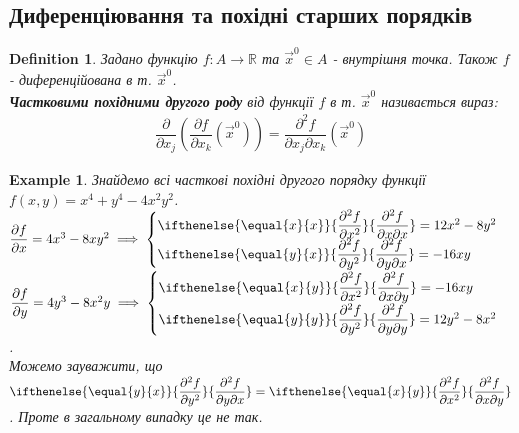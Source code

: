 \documentclass[a4paper, 10pt]{article}
\def\departial#1#2{\dfrac{\partial {#1}}{\partial {#2}}}
\def\seconddepartial#1#2#3{\ifthenelse{\equal{#2}{#3}}{\dfrac{\partial^2 {#1}}{\partial {#2}^2}}{\dfrac{\partial^2 {#1}}{\partial {#2} \partial {#3}}}}
\theoremstyle{theoremdd}
\theoremstyle{theoremdd}
\newtheorem{definition}[theorem]{Definition}
\theoremstyle{theoremdd}
\theoremstyle{theoremdd}
\newtheorem{example}[theorem]{Example}
\theoremstyle{theoremdd}
\theoremstyle{theoremdd}
\theoremstyle{theoremdd}
\theoremstyle{theoremdd}
\begin{document}
\subsection{Диференціювання та похідні старших порядків}
\begin{definition}
Задано функцію $f: A \to \mathbb{R}$ та $\vec{x}^0 \in A$ - внутрішня точка. Також $f$ - диференційована в т. $\vec{x}^0$.\\
\textbf{Частковими похідними другого роду} від функції $f$ в т. $\vec{x}^0$ називається вираз:
\begin{align*}
\dfrac{\partial}{\partial x_j} \left( \dfrac{\partial f}{\partial x_k} (\vec{x}^0) \right) = \dfrac{\partial^2 f}{\partial x_j \partial x_k} (\vec{x}^0)
\end{align*}
\end{definition}

\begin{example}
Знайдемо всі часткові похідні другого порядку функції $f(x,y) = x^4+y^4-4x^2y^2$.\\
$\departial{f}{x} = 4x^3 - 8xy^2 \implies \begin{cases} \seconddepartial{f}{x}{x} = 12x^2 - 8y^2 \\ \seconddepartial{f}{y}{x} = -16xy \end{cases}$ \hspace{1cm} $\departial{f}{y} = 4y^3 - 8x^2y \implies \begin{cases} \seconddepartial{f}{x}{y} = -16xy \\ \seconddepartial{f}{y}{y} = 12y^2-8x^2 \end{cases}$.\\
Можемо зауважити, що $\seconddepartial{f}{y}{x} = \seconddepartial{f}{x}{y}$. Проте в загальному випадку це не так.
\end{example}
\end{document}
